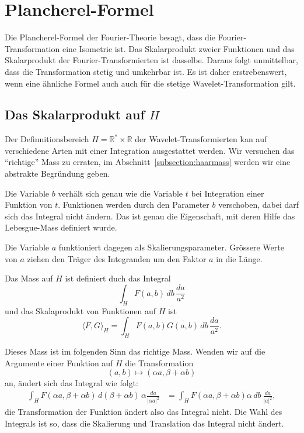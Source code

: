 %
%
%
\section{Plancherel-Formel%
\label{section:cwt:plancherel}}
Die Plancherel-Formel der Fourier-Theorie besagt, dass die
Fourier-Transformation eine Isometrie ist.
Das Skalarprodukt zweier Funktionen und das Skalarprodukt der
Fourier-Transformierten ist dasselbe.
Daraus folgt unmittelbar, dass die Transformation stetig und
umkehrbar ist.
Es ist daher erstrebenswert, wenn eine ähnliche Formel auch
auch für die stetige Wavelet-Transformation gilt.

\subsection{Das Skalarprodukt auf $H$}
Der Definnitionsbereich $H=\mathbb R^* \times \mathbb R$ der
Wavelet-Transformierten kan auf verschiedene Arten mit einer Integration
ausgestattet werden.
Wir versuchen das ``richtige'' Mass zu erraten, im
Abschnitt~\ref{subsection:haarmass} werden wir eine abstrakte Begründung
geben.

Die Variable $b$ verhält sich genau wie die Variable $t$ bei Integration
einer Funktion von $t$.
Funktionen werden durch den Parameter $b$ verschoben, dabei darf sich
das Integral nicht ändern.
Das ist genau die Eigenschaft, mit deren Hilfe das Lebesgue-Mass
definiert wurde.

Die Variable $a$ funktioniert dagegen als Skalierungsparameter.
Grössere Werte von $a$ ziehen den Träger des Integranden um den Faktor $a$ 
in die Länge.

\begin{definition}
\label{cwt:definition:plancherel}
Das Mass auf $H$ ist definiert duch das Integral
\[
\int_H F(a,b)\,db \,\frac{da}{a^2}
\]
und das Skalaprodukt von Funktionen auf $H$ ist
\[
\langle F,G\rangle_H
=
\int_{H} F(a,b)\overline{G(a,b)}\,db \,\frac{da}{a^2}.
\]
\end{definition}

Dieses Mass ist im folgenden Sinn das richtige Mass.
Wenden wir auf die Argumente einer Funktion auf $H$ die Transformation
\[
(a,b) \mapsto (\alpha a, \beta + \alpha b)
\]
an, ändert sich das Integral wie folgt:
\begin{align*}
\int_H F(\alpha a,\beta + \alpha b)\,d(\beta + \alpha b)\,\alpha\frac{da}{|\alpha a|^2}
&=
\int_H F(\alpha a,\beta + \alpha b) \alpha\,db \ \frac{da}{|a|^2},
\end{align*}
die Transformation der Funktion ändert also das Integral nicht.
Die Wahl des Integrals ist so, dass die Skalierung und Translation
das Integral nicht ändert.

